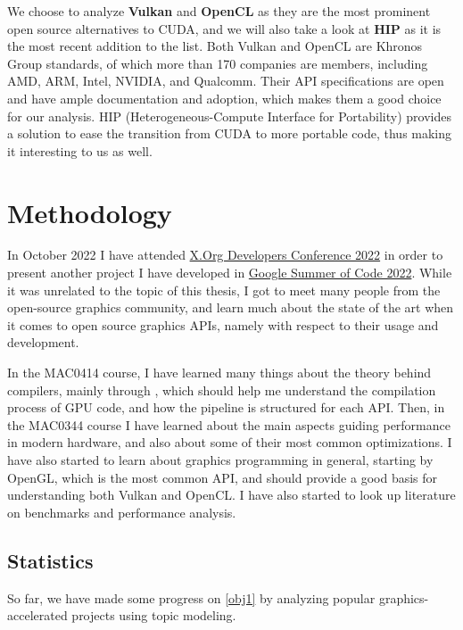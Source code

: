 \documentclass[11pt, conference, onecolumn, final]{IEEEtran}
\begin{document}
We choose to analyze \textbf{Vulkan} and \textbf{OpenCL} as they are the most
prominent open source alternatives to CUDA, and we will also take a look at
\textbf{HIP} as it is the most recent addition to the list.
Both Vulkan and OpenCL are Khronos Group standards, of which more than 170
companies are members, including AMD, ARM, Intel, NVIDIA, and Qualcomm.
Their API specifications are open and have ample documentation and adoption,
which makes them a good choice for our analysis.
HIP (Heterogeneous-Compute Interface for Portability) provides a solution to
ease the transition from CUDA to more portable code, thus making it interesting
to us as well.

\section{Methodology} \label{sec:methodology}

In October 2022 I have attended
\href{https://indico.freedesktop.org/event/2/page/11-overview}{X.Org Developers Conference 2022}
in order to present another project I have developed in
\href{https://summerofcode.withgoogle.com/programs/2022/projects/6AoBcunH}{Google Summer of Code 2022}.
While it was unrelated to the topic of this thesis, I got to meet many people
from the open-source graphics community, and learn much about the state of the
art when it comes to open source graphics APIs, namely with respect to their
usage and development.

In the MAC0414 course, I have learned many things about the theory behind
compilers, mainly through \cite{sipser1996introduction}, which should help me
understand the compilation process of GPU code, and how the pipeline is
structured for each API.
Then, in the MAC0344 course I have learned about the main aspects guiding
performance in modern hardware, and also about some of their most common
optimizations.
I have also started to learn about graphics programming in general, starting by
OpenGL, which is the most common API, and should provide a good basis for
understanding both Vulkan and OpenCL.
I have also started to look up literature on benchmarks and performance
analysis.

\subsection{Statistics} \label{sec:methodology:statistics}

So far, we have made some progress on \cref{obj1} by analyzing popular
graphics-accelerated projects using topic modeling.
\end{document}
